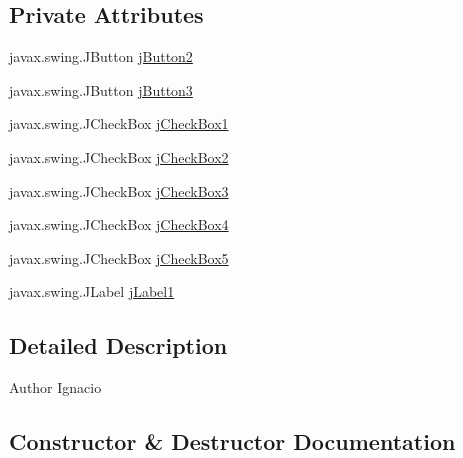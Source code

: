 \subsection*{Private Attributes}
\begin{DoxyCompactItemize}
\item 
javax.\+swing.\+J\+Button \mbox{\hyperlink{classinterfacessoguar_1_1cu14_aac32954c8931314e7a2554cb59e49c14}{j\+Button2}}
\item 
javax.\+swing.\+J\+Button \mbox{\hyperlink{classinterfacessoguar_1_1cu14_a11bd8f94543f8cf53621a6e49d32df73}{j\+Button3}}
\item 
javax.\+swing.\+J\+Check\+Box \mbox{\hyperlink{classinterfacessoguar_1_1cu14_a2719e7cf9ebc34ab6a28e47fe931c20c}{j\+Check\+Box1}}
\item 
javax.\+swing.\+J\+Check\+Box \mbox{\hyperlink{classinterfacessoguar_1_1cu14_a208f32a207595bd065c51596f0071a50}{j\+Check\+Box2}}
\item 
javax.\+swing.\+J\+Check\+Box \mbox{\hyperlink{classinterfacessoguar_1_1cu14_a4c2786ad18eecca82117bb2332a5cd4e}{j\+Check\+Box3}}
\item 
javax.\+swing.\+J\+Check\+Box \mbox{\hyperlink{classinterfacessoguar_1_1cu14_ae6475562256fe6faa9f5f9cd776c64ab}{j\+Check\+Box4}}
\item 
javax.\+swing.\+J\+Check\+Box \mbox{\hyperlink{classinterfacessoguar_1_1cu14_a76e9292b610a4832a729e128895d01cf}{j\+Check\+Box5}}
\item 
javax.\+swing.\+J\+Label \mbox{\hyperlink{classinterfacessoguar_1_1cu14_ae89f56f50be4fe2708a41087efcd4f01}{j\+Label1}}
\end{DoxyCompactItemize}


\subsection{Detailed Description}
\begin{DoxyAuthor}{Author}
Ignacio 
\end{DoxyAuthor}


\subsection{Constructor \& Destructor Documentation}
\mbox{\label{classinterfacessoguar_1_1cu14_a0d92e122ad24e9589bfceac28cc7e92a}} 
